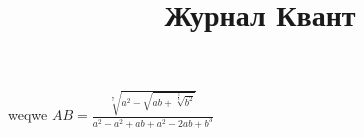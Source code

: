 \documentclass[10pt]{article}
\title{Журнал Квант}
\begin{document}
weqwe
$AB=\frac{\sqrt[7]{a^2-\sqrt{ab+\sqrt[\frac{3}{4}]{b^2}}}}{a^2-a^2+ab+a^2-2ab+b^3}$

$$
$$
\end{document}
